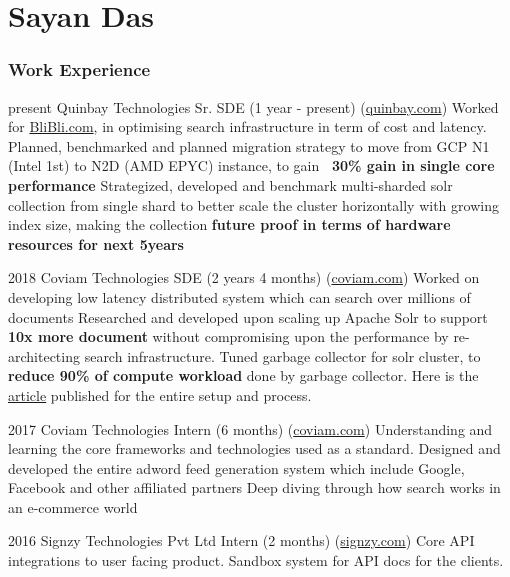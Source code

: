 \documentclass{tccv}
\begin{document}
\part{Sayan Das}

\section{Work Experience}

\begin{yearlist}

\item{present}
     {Quinbay Technologies Sr. SDE (1 year - present) (\href{https://quinbay.com}{quinbay.com})}
     {
        Worked for \href{blibli.com}{BliBli.com}, in optimising search infrastructure in term of cost and latency. \newline
        Planned, benchmarked and planned migration strategy to move from GCP N1 (Intel 1st) to N2D (AMD EPYC) instance, to gain \textbf{~30\% gain in single core performance}
        \newline
        Strategized, developed and benchmark multi-sharded solr collection from single shard to better scale the cluster horizontally  with growing index size, making the collection \textbf{future proof in terms of hardware resources for next 5years}
     }

\item{2018}
     {Coviam Technologies SDE (2 years 4 months) (\href{https://coviam.com}{coviam.com})}
     {
        Worked on developing low latency distributed system which can search over millions of documents \newline
        Researched and developed upon scaling up Apache Solr to support \textbf{10x more document} without compromising upon the performance by re-architecting search infrastructure.
        \newline
        Tuned garbage collector for solr cluster, to  \textbf{reduce 90\% of compute workload} done by garbage collector. Here is the \hyperlink{https://medium.com/bliblidotcom-techblog/optimizing-solr-resources-with-g1-448bb9c49d46}{article} published for the entire setup and process.
     }

\item{2017}
     {Coviam Technologies Intern (6 months) (\href{https://coviam.com}{coviam.com})}
     {
        Understanding and learning the core frameworks and technologies used as a standard. \newline
        Designed and developed the entire adword feed generation system  which include Google, Facebook and other affiliated partners \newline
        Deep diving through how search works in an e-commerce world \newline
     }

\item{2016}
     {Signzy Technologies Pvt Ltd Intern (2 months) (\href{https://signzy.com}{signzy.com})}
     {Core API integrations to user facing product. Sandbox system for API docs for the clients.}

\end{yearlist}
\end{document}
